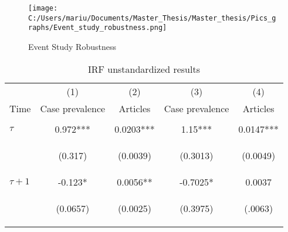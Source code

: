 \documentclass{article}
\begin{document}
\begin{figure}[!ht]
\begin{center}\caption{Event Study Robustness \label{Event Study Robustness}}
\texttt{[image: C:/Users/mariu/Documents/Master\_Thesis/Master\_thesis/Pics\_graphs/Event\_study\_robustness.png]}\\
\end{center}
\end{figure}


\begin{table}[htbp] \caption{IRF unstandardized results \label{Appendix - IRF unstandardized}}
\begin{tabular}{lcccc} \hline
 & (1) & (2) & (3) & (4)\\
Time & Case prevalence & Articles & Case prevalence & Articles\\ \hline
\vspace{4pt} & \begin{footnotesize}\end{footnotesize} & \begin{footnotesize}\end{footnotesize} & \begin{footnotesize}\end{footnotesize} \\
$\tau$ & 0.972*** & 0.0203***  & 1.15*** & 0.0147***\\
\vspace{4pt} & \begin{footnotesize}(0.317)\end{footnotesize} & \begin{footnotesize}(0.0039)\end{footnotesize} & \begin{footnotesize}(0.3013)\end{footnotesize} & \begin{footnotesize}(0.0049)\end{footnotesize}\\
$\tau + 1$ &  -0.123* & 0.0056** & -0.7025*  & 0.0037\\
 & \begin{footnotesize}(0.0657)\end{footnotesize} & \begin{footnotesize}(0.0025)\end{footnotesize} & \begin{footnotesize}(0.3975)\end{footnotesize} & \begin{footnotesize}(.0063)\end{footnotesize} \\

\end{tabular}
\end{table}
\end{document}
